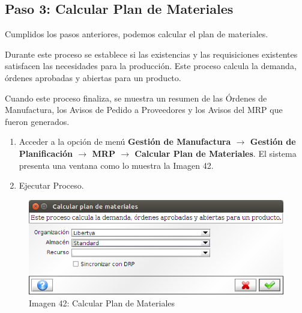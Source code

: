 \documentclass[letterpaper,10pt,spanish]{sphinxmanual}
\begin{document}
\subsection{Paso 3: Calcular Plan de Materiales}
\label{manufactura-proceso:paso-3-calcular-plan-de-materiales}
Cumplidos los pasos anteriores, podemos calcular el plan de materiales.

Durante este proceso se establece si las existencias y las requisiciones existentes satisfacen las necesidades para la producción. Este proceso calcula la demanda, órdenes aprobadas y abiertas para un producto.

Cuando este proceso finaliza, se muestra un resumen de las Órdenes de Manufactura, los Avisos de Pedido a Proveedores y los Avisos del MRP que fueron generados.
\begin{enumerate}
\item {} 
Acceder a la opción de menú \textbf{Gestión de Manufactura \(\rightarrow\) Gestión de Planificación \(\rightarrow\) MRP \(\rightarrow\) Calcular Plan de Materiales}. El sistema presenta una ventana como lo muestra la Imagen 42.

\item {} 
Ejecutar Proceso.

\end{enumerate}
\begin{figure}[htbp]
\centering
\capstart

\includegraphics{ly_mrp_calcular.png}
\caption{Imagen 42: Calcular Plan de Materiales}\end{figure}
\end{document}
